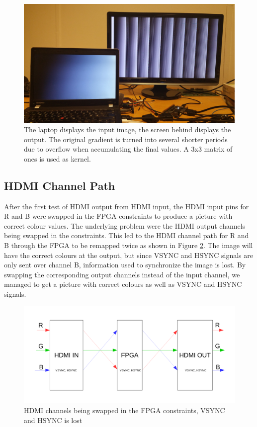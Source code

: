 \begin{figure}
    \centering
    \includegraphics[width=14cm]{img/gradient_test}
    \caption[The laptop displays the input image, the screen behind displays the output.]{
        The laptop displays the input image, the screen behind displays the output.
        The original gradient is turned into several shorter periods due to overflow when accumulating the final values.
        A 3x3 matrix of ones is used as kernel.
    }
    \label{fig:Overflow}

\end{figure}

\subsection{HDMI Channel Path}
After the first test of HDMI output from HDMI input, the HDMI input pins for R and B were swapped in the FPGA constraints to produce a picture with correct colour values.
The underlying problem were the HDMI output channels being swapped in the constraints. 
This led to the HDMI channel path for R and B through the FPGA to be remapped twice as shown in Figure \ref{fig:hdmiChannelPath}.
The image will have the correct colours at the output, but since VSYNC and HSYNC signals are only sent over channel B, information used to synchronize the image is lost.
By swapping the corresponding output channels instead of the input channel, we managed to get a picture with correct colours as well as VSYNC and HSYNC signals.

\begin{figure}[h!]
    \includegraphics[width=\linewidth]{img/hdmi_channel_path.pdf}
    \caption[HDMI channels being swapped in the FPGA constraints.]{HDMI channels being swapped in the FPGA constraints, VSYNC and HSYNC is lost}
    \label{fig:hdmiChannelPath}
\end{figure}

